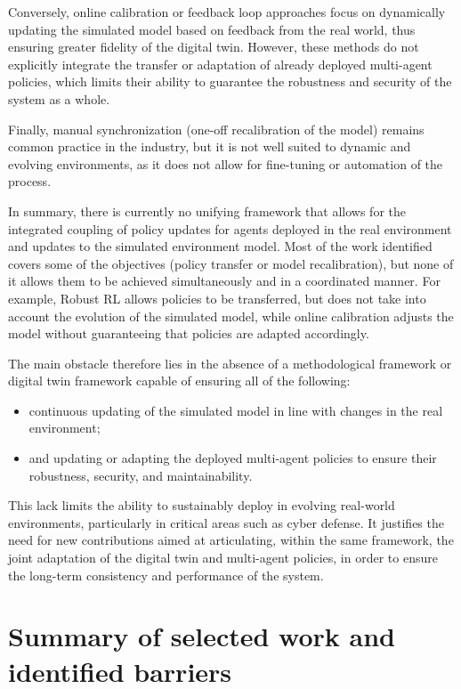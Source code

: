 Conversely, online calibration or feedback loop approaches focus on dynamically updating the simulated model based on feedback from the real world, thus ensuring greater fidelity of the digital twin. However, these methods do not explicitly integrate the transfer or adaptation of already deployed multi-agent policies, which limits their ability to guarantee the robustness and security of the system as a whole.

Finally, manual synchronization (one-off recalibration of the model) remains common practice in the industry, but it is not well suited to dynamic and evolving environments, as it does not allow for fine-tuning or automation of the process.

In summary, there is currently no unifying framework that allows for the integrated coupling of policy updates for agents deployed in the real environment and updates to the simulated environment model. Most of the work identified covers some of the objectives (policy transfer or model recalibration), but none of it allows them to be achieved simultaneously and in a coordinated manner. For example, Robust RL allows policies to be transferred, but does not take into account the evolution of the simulated model, while online calibration adjusts the model without guaranteeing that policies are adapted accordingly.

The main obstacle therefore lies in the absence of a methodological framework or digital twin framework capable of ensuring all of the following:
\begin{itemize}
  \item continuous updating of the simulated model in line with changes in the real environment;
  \item and updating or adapting the deployed multi-agent policies to ensure their robustness, security, and maintainability.
\end{itemize}

This lack limits the ability to sustainably deploy  in evolving real-world environments, particularly in critical areas such as cyber defense. It justifies the need for new contributions aimed at articulating, within the same framework, the joint adaptation of the digital twin and multi-agent policies, in order to ensure the long-term consistency and performance of the system.


\section*{Summary of selected work and identified barriers}

